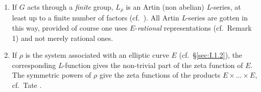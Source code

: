 \begin{examples}
\begin{enumerate}[label=\arabic*.,leftmargin=2.2em,itemsep=0.15ex,topsep=0.4ex]
\item If $G$ acts through a \emph{finite} group, $L_\rho$ is an Artin
(non abelian) \textit{L}-series, at least up to a finite number of
factors (cf.~\cite{artin-collected}).  All Artin \textit{L}-series are
gotten in this way, provided of course one uses $E$-\emph{rational}
representations (cf.~Remark 1) and not merely rational ones.

\item If $\rho$ is the system associated with an elliptic curve $E$
(cf.~\S\ref{sec:I.1.2}), the corresponding \textit{L}-function gives
the non-trivial part of the zeta function of $E$.  The symmetric
powers of $\rho$ give the zeta functions of the products
$E \times \ldots \times E$, cf.~Tate \cite{tate-cycles}.
\end{enumerate}
\end{examples}
